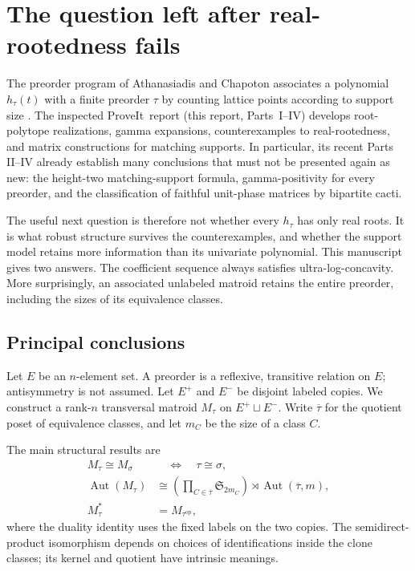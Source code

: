 \documentclass[11pt]{article}
\numberwithin{equation}{section}
\theoremstyle{definition}
\newcommand{\Aut}{\operatorname{Aut}}
\begin{document}
\section{The question left after real-rootedness fails}
\label{mat:sec:overview}
The preorder program of Athanasiadis and Chapoton associates a polynomial
$h_\tau(t)$ with a finite preorder $\tau$ by counting lattice points according
to support size \cite{AC}. The inspected ProveIt\ report (this report, Parts~I--IV) develops
root-polytope realizations, gamma expansions, counterexamples to
real-rootedness, and matrix constructions for matching supports. In particular, its recent Parts II--IV already establish
many conclusions that must not be presented again as new: the height-two
matching-support formula, gamma-positivity for every preorder, and the
classification of faithful unit-phase matrices by bipartite cacti.

The useful next question is therefore not whether every $h_\tau$ has only
real roots. It is what robust structure survives the counterexamples, and
whether the support model retains more information than its univariate
polynomial. This manuscript gives two answers. The coefficient sequence
always satisfies ultra-log-concavity. More surprisingly, an associated
unlabeled matroid retains the entire preorder, including the sizes of its
equivalence classes.

\subsection{Principal conclusions}
Let $E$ be an $n$-element set. A preorder is a reflexive, transitive relation
on $E$; antisymmetry is not assumed. Let $E^+$ and $E^-$ be disjoint labeled
copies. We construct a rank-$n$ transversal matroid $M_\tau$ on
$E^+\sqcup E^-$. Write $\overline\tau$ for the quotient poset of equivalence
classes, and let $m_C$ be the size of a class $C$.

The main structural results are
\begin{align}
M_\tau\cong M_\sigma&\quad\Longleftrightarrow\quad \tau\cong\sigma,
\label{mat:eq:intro-reconstruction}\\
\Aut(M_\tau)&\cong
 \left(\prod_{C\in\overline\tau}\mathfrak S_{2m_C}\right)
 \rtimes\Aut(\overline\tau,m),
\label{mat:eq:intro-aut}\\
M_\tau^*&=M_{\tau^{\mathrm{op}}},
\label{mat:eq:intro-dual}
\end{align}
where the duality identity uses the fixed labels on the two copies.
The semidirect-product isomorphism depends on choices of identifications
inside the clone classes; its kernel and quotient have intrinsic meanings.
\end{document}
